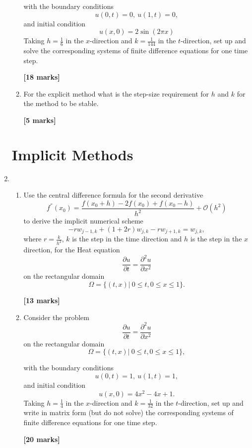 \begin{enumerate}
\begin{enumerate}
	with the boundary conditions
	\[ u(0,t)=0, \ u(1,t)=0,   \]
	and initial condition
	\[	u(x,0)=2\sin(2\pi x) \]
		Taking $h=\frac{1}{6}$ in the $x$-direction and $k=\frac{1}{144}$ in the $t$-direction, set up and solve the corresponding systems of finite difference equations for one time step.\\
\begin{flushright}
\textbf{[18 marks]}
\end{flushright}
	\item
	For the explicit method what is the step-size requirement for $h$ and $k$ for the method to be stable.
\begin{flushright}
\textbf{[5 marks]}
\end{flushright}
	
	
\end{enumerate}
\section{Implicit Methods}

	\item 
\begin{enumerate}
	
	\item 
	Use the central difference formula for the second derivative 
	\[ f^{''}(x_0)=\frac{f(x_0+h)-2f(x_0)+f(x_0-h)}{h^2}+\mathcal{O}(h^2)\]
	to derive the implicit numerical scheme
	\[-rw_{j-1,k}+(1+2r)w_{j,k}-rw_{j+1,k}=w_{j,k},\]
	where $r=\frac{k}{h^2}$, $k$ is the step in the time direction and $h$ is the step in the $x$ direction, 
	for the Heat equation 
	\[\frac{\partial u}{\partial t}=\frac{\partial^2 u}{\partial x^2} \]
	on the rectangular domain
		\[\Omega=\{(t,x)| \ 0\leq t, 0 \leq x \leq 1\}. \]

\begin{flushright}
\textbf{[13 marks]}
\end{flushright}
	
	\item Consider the problem
	\[\frac{\partial u}{\partial t}=\frac{\partial^2 u}{\partial x^2} \]
	on the rectangular domain
		\[\Omega=\{(t,x)| \ 0\leq t, 0 \leq x \leq 1\}, \]

	with the boundary conditions
	\[ u(0,t)=1, \ u(1,t)=1,   \]
	and initial condition
	\[	u(x,0)=4x^2-4x+1.\]
		Taking $h=\frac{1}{4}$ in the $x$-direction and $k=\frac{1}{32}$ in the $t$-direction, set up and write in matrix form (but do not solve) the corresponding systems of finite difference equations for one time step.\\
\begin{flushright}
\textbf{[20 marks]}
\end{flushright}
\end{enumerate}


\end{enumerate}
